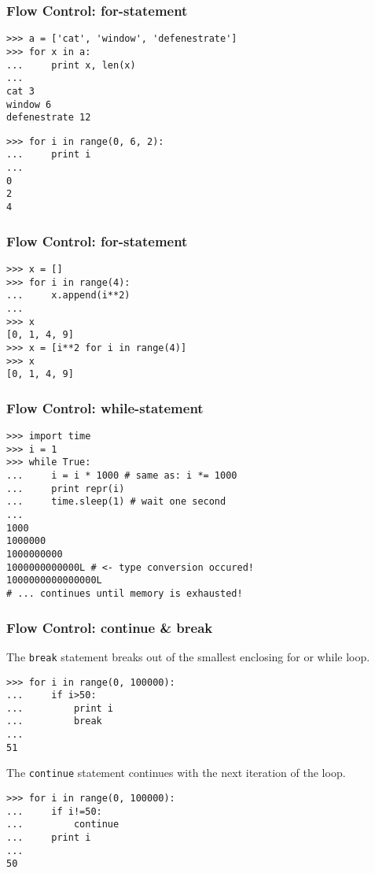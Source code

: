 \begin{frame}[fragile]
    \frametitle{Flow Control: for-statement}
    \begin{myColorBox}{0.9}{}
\begin{verbatim}
>>> a = ['cat', 'window', 'defenestrate']
>>> for x in a:
...     print x, len(x)
...
cat 3
window 6
defenestrate 12
\end{verbatim}
    \end{myColorBox}
    \pause
    \begin{myColorBox}{0.9}{}
\begin{verbatim}
>>> for i in range(0, 6, 2):
...     print i
...
0
2
4
\end{verbatim}
    \end{myColorBox}
\end{frame}

\begin{frame}[fragile]
\frametitle{Flow Control: for-statement}
\begin{myColorBox}{0.9}{}
\begin{verbatim}
>>> x = []
>>> for i in range(4):
...     x.append(i**2)
... 
>>> x
[0, 1, 4, 9]
>>> x = [i**2 for i in range(4)]
>>> x
[0, 1, 4, 9]
\end{verbatim}
\end{myColorBox}
\end{frame}

\begin{frame}[fragile]
    \frametitle{Flow Control: while-statement}
    \begin{myColorBox}{0.9}{}
\begin{verbatim}
>>> import time
>>> i = 1
>>> while True:
...     i = i * 1000 # same as: i *= 1000
...     print repr(i)
...     time.sleep(1) # wait one second
...
1000
1000000
1000000000
1000000000000L # <- type conversion occured!
1000000000000000L
# ... continues until memory is exhausted!
\end{verbatim}
    \end{myColorBox}
\end{frame}


\begin{frame}[fragile]
    \frametitle{Flow Control: continue \& break}
The \verb#break# statement breaks out of the smallest enclosing for or while loop.
    \begin{myColorBox}{0.9}{}
\begin{verbatim}
>>> for i in range(0, 100000):
...     if i>50:
...         print i
...         break
...
51
\end{verbatim}
    \end{myColorBox}
\pause
The \verb#continue# statement continues with the next iteration of the loop.
    \begin{myColorBox}{0.9}{}
\begin{verbatim}
>>> for i in range(0, 100000):
...     if i!=50:
...         continue
...     print i
...
50
\end{verbatim}
    \end{myColorBox}
\end{frame}


